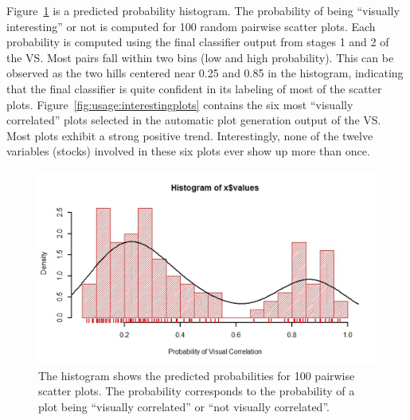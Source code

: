 \newpage
Figure~\ref{fig:usage:hist} is a predicted probability histogram. The 
probability of being ``visually interesting'' or not is computed for 100 random 
pairwise scatter plots. Each probability is computed using the final 
classifier output from stages 1 and 2 of the VS. Most pairs fall within two 
bins (low and high probability). This can be observed as the two hills centered 
near 0.25 and 0.85 in the histogram, indicating that the final classifier is 
quite confident in its labeling of most of the scatter plots.
Figure~\ref{fig:usage:interestingplots} contains the six most ``visually 
correlated'' plots 
selected in the automatic plot generation output of the VS. Most 
plots exhibit a strong positive trend. Interestingly, none of the twelve 
variables (stocks) involved in these six plots ever show up more than once. 

\begin{figure}[htb]
	\begin{center}
		\includegraphics[width=1\linewidth]
		{ch-usage/figures/predicted_probability_histogram}
		\caption[Histogram of predicted probabilities.]{The histogram shows the 
		predicted probabilities for 100 pairwise scatter plots. The 
		probability corresponds to the probability of a plot being 
		``visually correlated'' or ``not visually correlated''.}
		\label{fig:usage:hist}
	\end{center}
\end{figure}

